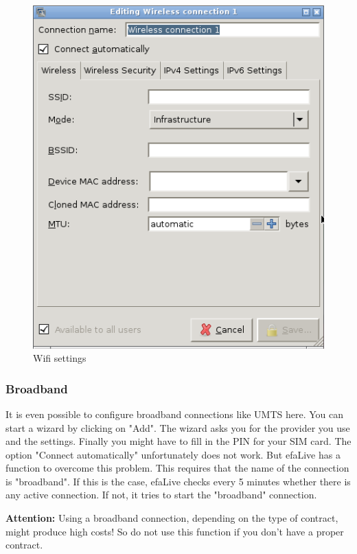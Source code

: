 \documentclass[a4paper,12pt,twoside]{article}
\begin{document}
\begin{figure}
    \centering
    \includegraphics[width=13cm]{efaLiveen-img/efaLiveen-img25.png}
    \caption{Wifi settings}
    \label{fig:wifi}
\end{figure}


\subsubsection{Broadband}
\label{sct:broadband}
It is even possible to configure broadband connections like UMTS here.
You can start a wizard by clicking on
"Add". The wizard asks you for the provider
you use and the settings. Finally you might have to fill in the PIN for
your SIM card. The option "Connect
automatically" unfortunately does not work. But efaLive
has a function to overcome this problem. This requires that the name of
the connection is "broadband". If this is
the case, efaLive checks every 5 minutes whether there is any active
connection. If not, it tries to start the
"broadband" connection.

\bigskip
\textbf{Attention:} Using a broadband connection, depending on the type of
contract, might produce high costs! So do not use this function if you
don't have a proper contract.
\bigskip
\end{document}
